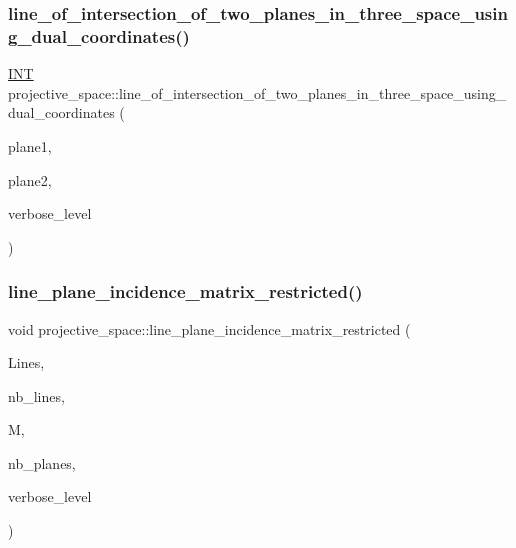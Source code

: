 \subsubsection{\texorpdfstring{line\+\_\+of\+\_\+intersection\+\_\+of\+\_\+two\+\_\+planes\+\_\+in\+\_\+three\+\_\+space\+\_\+using\+\_\+dual\+\_\+coordinates()}{line\_of\_intersection\_of\_two\_planes\_in\_three\_space\_using\_dual\_coordinates()}}
{\footnotesize\ttfamily \mbox{\hyperlink{galois_8h_a09fddde158a3a20bd2dcadb609de11dc}{I\+NT}} projective\+\_\+space\+::line\+\_\+of\+\_\+intersection\+\_\+of\+\_\+two\+\_\+planes\+\_\+in\+\_\+three\+\_\+space\+\_\+using\+\_\+dual\+\_\+coordinates (\begin{DoxyParamCaption}\item[{\mbox{\hyperlink{galois_8h_a09fddde158a3a20bd2dcadb609de11dc}{I\+NT}}}]{plane1,  }\item[{\mbox{\hyperlink{galois_8h_a09fddde158a3a20bd2dcadb609de11dc}{I\+NT}}}]{plane2,  }\item[{\mbox{\hyperlink{galois_8h_a09fddde158a3a20bd2dcadb609de11dc}{I\+NT}}}]{verbose\+\_\+level }\end{DoxyParamCaption})}

\mbox{\label{classprojective__space_aea493b37a2e5bc9e098706c87af84198}} 
\subsubsection{\texorpdfstring{line\+\_\+plane\+\_\+incidence\+\_\+matrix\+\_\+restricted()}{line\_plane\_incidence\_matrix\_restricted()}}
{\footnotesize\ttfamily void projective\+\_\+space\+::line\+\_\+plane\+\_\+incidence\+\_\+matrix\+\_\+restricted (\begin{DoxyParamCaption}\item[{\mbox{\hyperlink{galois_8h_a09fddde158a3a20bd2dcadb609de11dc}{I\+NT}} $\ast$}]{Lines,  }\item[{\mbox{\hyperlink{galois_8h_a09fddde158a3a20bd2dcadb609de11dc}{I\+NT}}}]{nb\+\_\+lines,  }\item[{\mbox{\hyperlink{galois_8h_a09fddde158a3a20bd2dcadb609de11dc}{I\+NT}} $\ast$\&}]{M,  }\item[{\mbox{\hyperlink{galois_8h_a09fddde158a3a20bd2dcadb609de11dc}{I\+NT}} \&}]{nb\+\_\+planes,  }\item[{\mbox{\hyperlink{galois_8h_a09fddde158a3a20bd2dcadb609de11dc}{I\+NT}}}]{verbose\+\_\+level }\end{DoxyParamCaption})}

